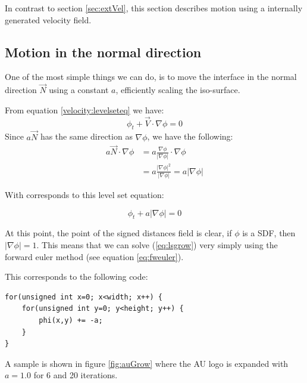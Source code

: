 

In contrast to section \vref{sec:extVel}, this section describes
motion using a internally generated velocity field.

\newpage

\subsection{Motion in the normal direction}

One of the most simple things we can do, is to move the interface in
the normal direction $\vec{N}$ using a constant $a$, efficiently
scaling the iso-surface.

From equation \vref{velocity:levelseteq} we have:
\begin{equation}
  \phi_t + \vec{V}\cdot \nabla \phi = 0
\end{equation}
Since $a\vec{N}$ has the same direction as $\nabla{\phi}$, we have the following:
\begin{align*}
  a\vec{N}\cdot\nabla\phi &=
  a\frac{\nabla\phi}{|\nabla\phi|}\cdot\nabla\phi \\
  &= a\frac{|\nabla\phi|^2}{|\nabla\phi|} 
  = a|\nabla\phi|
\end{align*}

With corresponds to this level set equation:

\begin{equation}
  \phi_t + a |\nabla \phi| = 0
\end{equation}\label{eq:lsgrow}

At this point, the point of the signed distances field is clear, if
$\phi$ is a SDF, then $|\nabla\phi| = 1$. This means that we can solve
(\ref{eq:lsgrow}) very simply using the forward euler method (see
equation \ref{eq:fweuler}).

This corresponds to the following code:

\begin{lstlisting}
for(unsigned int x=0; x<width; x++) {
    for(unsigned int y=0; y<height; y++) {
        phi(x,y) += -a;
    }
}
\end{lstlisting}

A sample is shown in figure \ref{fig:auGrow} where the AU logo is
expanded with $a=1.0$ for 6 and 20 iterations.


